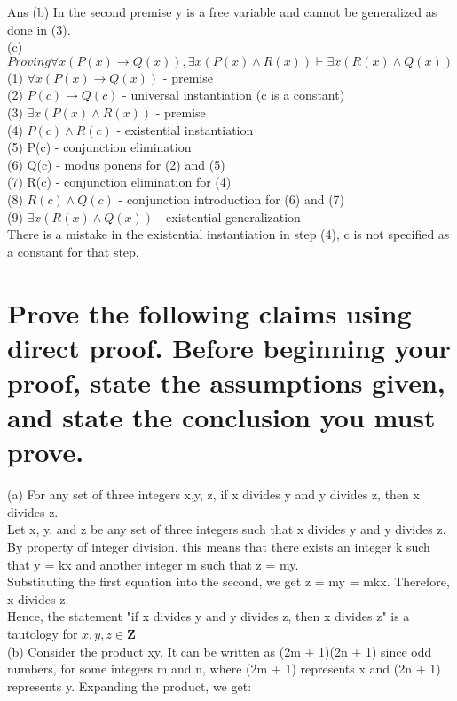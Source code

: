 \documentclass{article}
\begin{document}
Ans (b) In the second premise y is a free variable and cannot be generalized as done in (3).
\\

\Large (c) $Proving \forall x(P(x)\rightarrow Q(x)), \exists x(P(x)\land R(x)) \vdash \exists x(R(x)\land Q(x))$\\
(1) $ \forall x(P(x) \rightarrow Q(x))$ - premise\\
(2) $P(c)\rightarrow Q(c)$ - universal instantiation (c is a constant)\\
(3) $ \exists x(P(x)\land R(x))$ - premise\\
(4) $P(c)\land R(c)$ - existential instantiation\\
(5) P(c) - conjunction elimination\\
(6) Q(c) - modus ponens for (2) and (5)\\
(7) R(c) - conjunction elimination for (4)\\
(8) $R(c)\land Q(c)$ - conjunction introduction for (6) and (7)\\
(9) $\exists x(R(x)\land Q(x))$ - existential generalization
\\
There is a mistake in the existential instantiation in step (4), c is not specified as a constant for that step.
\\

\section{Prove the following claims using direct proof. Before beginning your proof, state the assumptions
given, and state the conclusion you must prove.}

\Large (a) For any set of three integers x,y, z, if x divides y and y divides z, then x divides z.\\

Let x, y, and z be any set of three integers such that x divides y and y divides z. By property of integer division, this means that there exists an integer k such that y = kx and another integer m such that z = my.\\

Substituting the first equation into the second, we get z = my = mkx. Therefore, x divides z.\\

Hence, the statement "if x divides y and y divides z, then x divides z" is a tautology for $x,y,z \in \mathbf{Z}$\\

\Large (b) 
Consider the product xy. It can be written as (2m + 1)(2n + 1) since odd numbers, for some integers m and n, where (2m + 1) represents x and (2n + 1) represents y. Expanding the product, we get:\\
\end{document}
